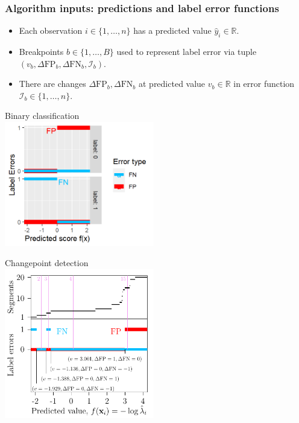 \documentclass[t]{beamer}
\begin{document}
\begin{frame}
  \frametitle{Algorithm inputs: predictions and label error functions}

  \begin{itemize}
  \item Each observation $i\in\{1,\dots,n\}$ has a predicted value
    $\hat y_i\in\mathbb R$.
  \item Breakpoints
  $b\in\{1,\dots, B\}$ used to represent label error via tuple
  $(v_b, \Delta\text{FP}_b, \Delta\text{FN}_b, \mathcal I_b)$.
\item There are changes $\Delta\text{FP}_b, \Delta\text{FN}_b$ at
  predicted value $v_b\in\mathbb R$ in error function
  $\mathcal I_b\in\{1,\dots,n\}$.
  \end{itemize}

  \parbox{0.49\textwidth}{
    Binary classification\\
  \includegraphics[width=0.49\textwidth]{figure-more-than-one-binary-errors}
}\parbox{0.49\textwidth}{
  Changepoint detection\\
  \includegraphics[width=0.49\textwidth]{figure-fn-not-monotonic-error-standAlone}}

\end{frame}
\end{document}
